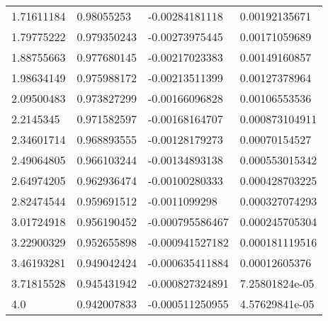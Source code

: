 \begin{longtable}{llll}
	1.71611184 & 0.98055253 & -0.00284181118 & 0.00192135671 \\ 
	1.79775222 & 0.979350243 & -0.00273975445 & 0.00171059689 \\ 
	1.88755663 & 0.977680145 & -0.00217023383 & 0.00149160857 \\ 
	1.98634149 & 0.975988172 & -0.00213511399 & 0.00127378964 \\ 
	2.09500483 & 0.973827299 & -0.00166096828 & 0.00106553536 \\ 
	2.2145345 & 0.971582597 & -0.00168164707 & 0.000873104911 \\ 
	2.34601714 & 0.968893555 & -0.00128179273 & 0.00070154527 \\ 
	2.49064805 & 0.966103244 & -0.00134893138 & 0.000553015342 \\ 
	2.64974205 & 0.962936474 & -0.00100280333 & 0.000428703225 \\ 
	2.82474544 & 0.959691512 & -0.0011099298 & 0.000327074293 \\ 
	3.01724918 & 0.956190452 & -0.000795586467 & 0.000245705304 \\ 
	3.22900329 & 0.952655898 & -0.000941527182 & 0.000181119516 \\ 
	3.46193281 & 0.949042424 & -0.000635411884 & 0.00012605376 \\ 
	3.71815528 & 0.945431942 & -0.000827324891 & 7.25801824e-05 \\ 
	4.0 & 0.942007833 & -0.000511250955 & 4.57629841e-05 \\ 
\end{longtable}